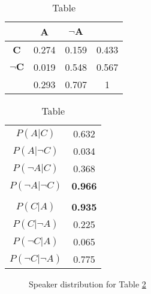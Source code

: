 \documentclass[10pt,a4paper]{article}
\begin{document}
\begin{table}
\begin{tabular}{c|cc|c}
		   			& \textbf{A} & $\boldsymbol{\neg A}$ & \\\hline
\textbf{C} 			& 0.274 & 0.159 & 0.433 \\
$\boldsymbol{\neg C}$	& 0.019 & 0.548 & 0.567 \\ \hline
					& 0.293 & 0.707 & 1
\end{tabular}
\qquad
\begin{tabular}{c|c}
$P(A|C)$ & 0.632 \\
$P(A|\neg C)$ & 0.034\\
$P(\neg A|C)$ & 0.368\\
$P(\neg A|\neg C)$ & \textbf{0.966}\\
& \\\hline
$P(C|A)$ & \textbf{0.935}\\
$P(C|\neg A)$ & 0.225\\
$P(\neg C|A)$ & 0.065\\
$P(\neg C|\neg A)$ & 0.775
\end{tabular}
\caption{Table}
\label{table:speakerGood}
\end{table}


\begin{figure}
\centering
\subfloat[]{\label{fig:speakergood}} 
\caption{Speaker distribution for Table \ref{table:speakerGood}}
\end{figure}
\end{document}
